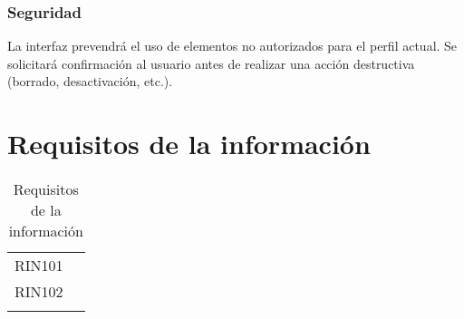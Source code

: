 \subsubsection*{Seguridad}
La interfaz prevendrá el uso de elementos no autorizados para el perfil actual. Se solicitará confirmación al usuario antes de realizar una acción  destructiva (borrado, desactivación, etc.).


\section{Requisitos de la información}
\label{cuadro:requisitos-de-la-informacion}
\begin{longtable}{lp{13.7cm}}
  RIN101\label{RF101} &  \\
  RIN102\label{RF102} &  \\
  \caption{Requisitos de la información} \\
\end{longtable}
